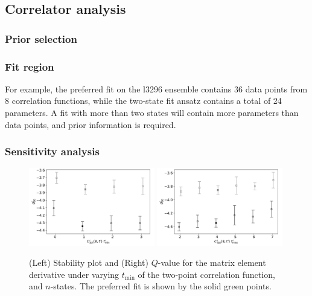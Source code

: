 \documentclass[prd,aps,twocolumn,superscriptaddress,tightenlines,nofootinbib,floatfix,preprintnumbers,10pt]{revtex4-1}
\begin{document}
\subsection{Correlator analysis}

\subsubsection{Prior selection}


\subsubsection{Fit region}

For example, the preferred fit on the l3296 ensemble contains 36 data points from 8 correlation functions, while the two-state fit ansatz contains a total of 24 parameters. A fit with more than two states will contain more parameters than data points, and prior information is required. 

\subsubsection{Sensitivity analysis}

\begin{figure}[t]{
		\includegraphics[width=0.49\textwidth]{plots/figures/3296_dgV8_dgV.pdf}
		\includegraphics[width=0.49\textwidth]{plots/figures/3296_dgV8_tmax_dgV.pdf}
		\caption{(Left) Stability plot and (Right) $Q$-value for the matrix element derivative under varying $t_{\mathrm{min}}$ of the two-point correlation function, and $n$-states. The preferred fit is shown by the solid green points.}
		\label{fig:stability_main}
}\end{figure}
\end{document}
